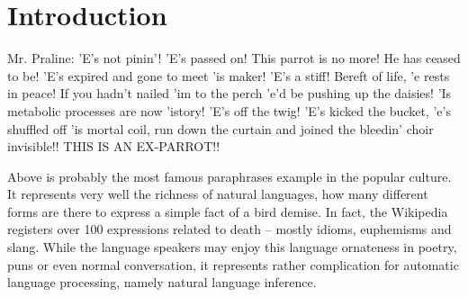 \chapter*{Introduction}


Mr. Praline: 'E's not pinin'! 'E's passed on! This parrot is no more! He has ceased to be! 'E's expired and gone to meet 'is maker! 'E's a stiff! Bereft of life, 'e rests in peace! If you hadn't nailed 'im to the perch 'e'd be pushing up the daisies! 'Is metabolic processes are now 'istory! 'E's off the twig! 'E's kicked the bucket, 'e's shuffled off 'is mortal coil, run down the curtain and joined the bleedin' choir invisible!! THIS IS AN EX-PARROT!! 

Above is probably the most famous paraphrases example in the popular culture. 
It represents very well the richness of natural languages, how many different forms are there to express a simple fact of a bird demise. 
In fact, the Wikipedia registers over 100 expressions related to death -- mostly idioms, euphemisms and slang.  \citep{wiki:death} 
While the language speakers may enjoy this language ornateness in poetry, puns or even normal conversation, it represents rather complication for automatic language processing, namely natural language inference.




